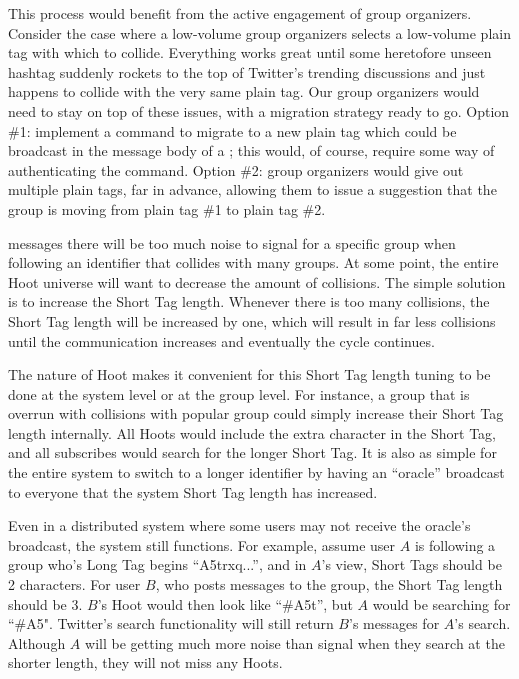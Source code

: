 This process would benefit from the active engagement of group organizers. Consider the case where a low-volume group organizers selects a low-volume plain tag with which to collide. Everything works great until some heretofore unseen hashtag suddenly rockets to the top of Twitter's trending discussions and just happens to collide with the very same plain tag. Our group organizers would need to stay on top of these issues, with a migration strategy ready to go. Option \#1: implement a command to migrate to a new plain tag which could be broadcast in the message body of a \hoot; this would, of course, require some way of authenticating the command. Option \#2: group organizers would give out multiple plain tags, far in advance, allowing them to issue a suggestion that the group is moving from plain tag \#1 to plain tag \#2.

messages  there will be too much noise to signal for a specific group when following an identifier that collides with many groups. At some point, the entire Hoot universe will want to decrease the amount of collisions. The simple solution is to increase the Short Tag length. Whenever there is too many collisions, the Short Tag length will be increased by one, which will result in far less collisions until the communication increases and eventually the cycle continues. 

The nature of Hoot makes it convenient for this Short Tag length tuning to be done at the system level or at the group level. For instance, a group that is overrun with collisions with popular group could simply increase their Short Tag length internally. All Hoots would include the extra character in the Short Tag, and all subscribes would search for the longer Short Tag. It is also as simple for the entire system to switch to a longer identifier by having an ``oracle'' broadcast to everyone that the system Short Tag length has increased.

Even in a distributed system where some users may not receive the oracle's broadcast, the system still functions. For example, assume user $A$ is following a group who's Long Tag begins ``A5trxq...'', and in $A$'s view, Short Tags should be 2 characters. For user $B$, who posts messages to the group, the Short Tag length should be 3. $B$'s Hoot would then look like ``\#A5t'', but $A$ would be searching for ``\#A5". Twitter's search functionality will still return $B$'s messages for $A$'s search. Although $A$ will be getting much more noise than signal when they search at the shorter length, they will not miss any Hoots.

